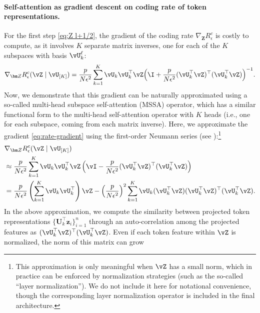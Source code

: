 \documentclass[../../book-main.tex]{subfiles}
\begin{document}
\paragraph{Self-attention as gradient descent on coding rate of token
representations.} For the first step \eqref{eq:Z l+1/2}, the gradient
of the coding rate \(\nabla_{\bm Z} R^c_\epsilon\) is costly to
compute, as it involves \(K\) separate matrix inverses, one for each
of the \(K\) subspaces with basis \(\vU_{k}^{\ell}\):
\begin{equation}
    \nabla_{\bm Z} R_{\epsilon}^c(\vZ \mid \vU_{[K]})
    = \frac{p}{N\epsilon^2}\sum_{k=1}^K \vU_k\vU_k^\top\vZ\Big(\I +
    \frac{p}{N\epsilon^2}(\vU_k^\top\vZ)^\top(\vU_k^\top\vZ)\Big)^{-1}.
    \label{eq:rate-gradient}
\end{equation}
Now, we demonstrate that this gradient can be naturally approximated
using a so-called multi-head subspace self-attention (MSSA) operator,
which has a similar functional form to the multi-head self-attention
operator \citep{vaswani2017attention} with \(K\) heads (i.e., one for
each subspace, coming from each matrix inverse). Here, we approximate
the gradient \eqref{eq:rate-gradient} using the first-order Neumann
series (see ):\footnote{This approximation is only
    meaningful when \(\vZ\) has a small norm, which in practice can be
    enforced by normalization strategies (such as the so-called ``layer
    normalization''). We do not include it here for notational
    convenience, though the corresponding layer normalization operator is
included in the final architecture.}
\begin{align}\label{eq:gd_rc_neumann}
    &\nabla_{\bm Z} R_{\epsilon}^{c}(\vZ \mid \vU_{[K]}) \\
    &\approx \frac{p}{N\epsilon^2} \sum_{k =
    1}^{K}\vU_{k}\vU_{k}^\top\vZ\left(\vI - \frac{p}{N\epsilon^2}
    (\vU_{k}^\top\vZ)^\top(\vU_{k}^\top\vZ)\right) \\
    &= \frac{p}{N\epsilon^2} \left(\sum_{k = 1}^{K}
    \vU_{k}\vU_{k}^\top\right)\vZ -  \left(
    \frac{p}{N\epsilon^2}\right)^2\sum_{k = 1}^{K}
    \vU_{k}(\vU_{k}^\top\vZ)(\vU_{k}^\top\vZ)^\top(\vU_{k}^\top\vZ).
\end{align}
In the above approximation, we compute the similarity between projected
token representations $\{\bm U_k^\top\bm z_i\}_{i = 1}^{n}$ through an
auto-correlation among the projected features as
$(\vU_{k}^\top\vZ)^\top(\vU_{k}^\top\vZ)$. Even if each token feature
within \(\vZ\) is normalized, the norm of this matrix can grow
\end{document}
